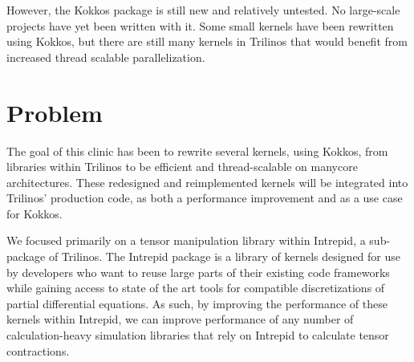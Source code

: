 However, the Kokkos package is still new and relatively untested.  No
large-scale projects have yet been written with it.  Some small kernels have
been rewritten using Kokkos, but there are still many kernels in Trilinos that
would benefit from increased thread scalable parallelization.


\section{Problem}

The goal of this clinic has been to rewrite several kernels, using Kokkos, from libraries within
Trilinos to be efficient and thread-scalable on manycore architectures.  
These redesigned and reimplemented kernels will be integrated into
Trilinos' production code, as both a performance improvement and as a use case
for Kokkos.

We focused primarily on a tensor manipulation library within Intrepid, a sub-package of Trilinos. 
The Intrepid package is a library of kernels designed for use by developers who want to reuse large
parts of their existing code frameworks while gaining access to state of the art
tools for compatible discretizations of partial differential equations. As such, by improving the 
performance of these kernels within Intrepid, we can improve performance
of any number of calculation-heavy simulation libraries that rely on Intrepid to calculate tensor contractions.




